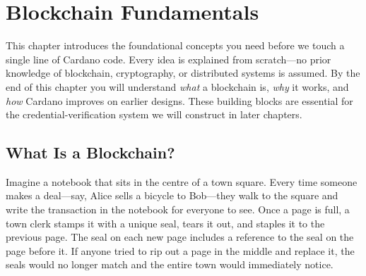 


\chapter{Blockchain Fundamentals}
\label{ch:blockchain-fundamentals}

This chapter introduces the foundational concepts you need before we touch a
single line of Cardano code.  Every idea is explained from scratch---no prior
knowledge of blockchain, cryptography, or distributed systems is assumed.  By
the end of this chapter you will understand \emph{what} a blockchain is,
\emph{why} it works, and \emph{how} Cardano improves on earlier designs.
These building blocks are essential for the credential-verification system we
will construct in later chapters.

\section{What Is a Blockchain?}
\label{sec:what-is-blockchain}

Imagine a notebook that sits in the centre of a town square.  Every time
someone makes a deal---say, Alice sells a bicycle to Bob---they walk to the
square and write the transaction in the notebook for everyone to see.  Once a
page is full, a town clerk stamps it with a unique seal, tears it out, and
staples it to the previous page.  The seal on each new page includes a
reference to the seal on the page before it.  If anyone tried to rip out a
page in the middle and replace it, the seals would no longer match and the
entire town would immediately notice.

